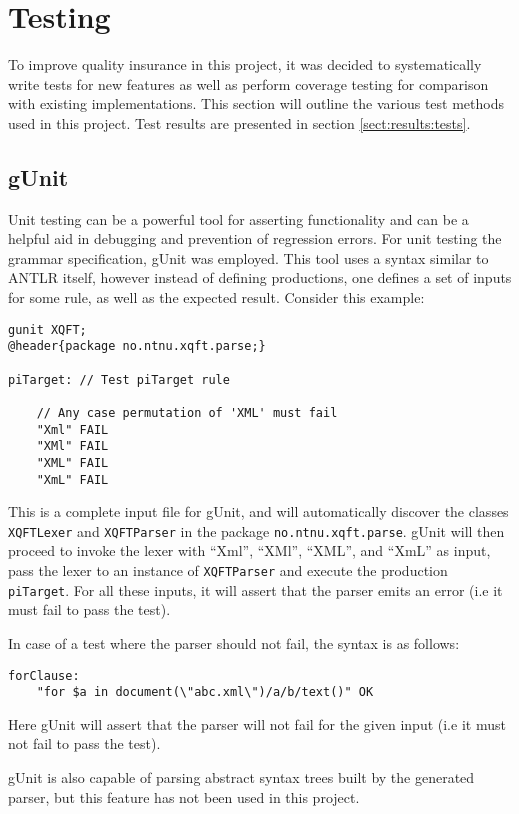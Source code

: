 \section{Testing}
\label{sect:method:testing}
To improve quality insurance in this project, it was decided to systematically
write tests for new features as well as perform coverage testing for comparison
with existing implementations. This section will outline the various test
methods used in this project. Test results are presented in section \ref{sect:results:tests}.

\subsection{gUnit}
\label{sect:method:gUnit}
Unit testing can be a powerful tool for asserting functionality and can be a
helpful aid in debugging and prevention of regression errors.  For unit testing the
grammar specification, gUnit \cite{gunit00} was employed. This tool uses a
syntax similar to ANTLR itself, however instead of defining productions, one
defines a set of inputs for some rule, as well as the expected result. Consider
this example:

\begin{Verbatim}
gunit XQFT;
@header{package no.ntnu.xqft.parse;}

piTarget: // Test piTarget rule

    // Any case permutation of 'XML' must fail
    "Xml" FAIL
    "XMl" FAIL
    "XML" FAIL
    "XmL" FAIL
\end{Verbatim}

This is a complete input file for gUnit, and will automatically discover the
classes \verb!XQFTLexer! and \verb!XQFTParser! in the package
\verb!no.ntnu.xqft.parse!. gUnit will  then proceed to invoke the lexer with
``Xml'', ``XMl'', ``XML'', and ``XmL'' as input, pass the lexer to an instance
of \verb!XQFTParser! and execute the production \verb!piTarget!. For all these
inputs, it will assert that the parser emits an error (i.e it must fail to pass
the test).

In case of a test where the parser should not fail, the syntax is as follows:
\begin{Verbatim}
forClause:
	"for $a in document(\"abc.xml\")/a/b/text()" OK
\end{Verbatim}
Here gUnit will assert that the parser will not fail for the given input (i.e it
must not fail to pass the test).

gUnit is also capable of parsing abstract syntax trees built by the generated
parser, but this feature has not been used in this project.

